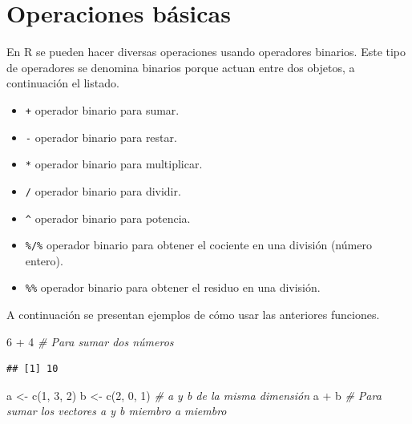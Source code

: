 \documentclass[
]{book}
\makeatletter
\newenvironment{Shaded}{\begin{snugshade}}{\end{snugshade}}
\newcommand{\CommentTok}[1]{\textcolor[rgb]{0.56,0.35,0.01}{\textit{#1}}}
\newcommand{\DecValTok}[1]{\textcolor[rgb]{0.00,0.00,0.81}{#1}}
\newcommand{\FunctionTok}[1]{\textcolor[rgb]{0.00,0.00,0.00}{#1}}
\newcommand{\NormalTok}[1]{#1}
\newcommand{\OtherTok}[1]{\textcolor[rgb]{0.56,0.35,0.01}{#1}}
\newcommand{\SpecialCharTok}[1]{\textcolor[rgb]{0.00,0.00,0.00}{#1}}
\providecommand{\tightlist}{%
  \setlength{\itemsep}{0pt}\setlength{\parskip}{0pt}}
\newenvironment{kframe}{%
\medskip{}
\setlength{\fboxsep}{.8em}
 \def\at@end@of@kframe{}%
 \ifinner\ifhmode%
  \def\at@end@of@kframe{\end{minipage}}%
  \begin{minipage}{\columnwidth}%
 \fi\fi%
 \def\FrameCommand##1{\hskip\@totalleftmargin \hskip-\fboxsep
 \colorbox{shadecolor}{##1}\hskip-\fboxsep
     \hskip-\linewidth \hskip-\@totalleftmargin \hskip\columnwidth}%
 \MakeFramed {\advance\hsize-\width
   \@totalleftmargin\z@ \linewidth\hsize
   \@setminipage}}%
 {\par\unskip\endMakeFramed%
 \at@end@of@kframe}
\renewenvironment{Shaded}{\begin{kframe}}{\end{kframe}}
\makeatother
\begin{document}
\hypertarget{operaciones-buxe1sicas}{%
\section{Operaciones básicas}\label{operaciones-buxe1sicas}}

En R se pueden hacer diversas operaciones usando operadores binarios. Este tipo de operadores se denomina binarios porque actuan entre dos objetos, a continuación el listado.

\begin{itemize}
\tightlist
\item
  \texttt{+} operador binario para sumar.
\item
  \texttt{-} operador binario para restar.
\item
  \texttt{*} operador binario para multiplicar.
\item
  \texttt{/} operador binario para dividir.
\item
  \texttt{\^{}} operador binario para potencia.
\item
  \texttt{\%/\%} operador binario para obtener el cociente en una división (número entero).
\item
  \texttt{\%\%} operador binario para obtener el residuo en una división.
\end{itemize}

A continuación se presentan ejemplos de cómo usar las anteriores funciones.

\begin{Shaded}
\begin{Highlighting}[]
\DecValTok{6} \SpecialCharTok{+} \DecValTok{4}  \CommentTok{\# Para sumar dos números}
\end{Highlighting}
\end{Shaded}

\begin{verbatim}
## [1] 10
\end{verbatim}

\begin{Shaded}
\begin{Highlighting}[]
\NormalTok{a }\OtherTok{\textless{}{-}} \FunctionTok{c}\NormalTok{(}\DecValTok{1}\NormalTok{, }\DecValTok{3}\NormalTok{, }\DecValTok{2}\NormalTok{)}
\NormalTok{b }\OtherTok{\textless{}{-}} \FunctionTok{c}\NormalTok{(}\DecValTok{2}\NormalTok{, }\DecValTok{0}\NormalTok{, }\DecValTok{1}\NormalTok{)  }\CommentTok{\# a y b de la misma dimensión}
\NormalTok{a }\SpecialCharTok{+}\NormalTok{ b  }\CommentTok{\# Para sumar los vectores a y b miembro a miembro}
\end{Highlighting}
\end{Shaded}
\end{document}
